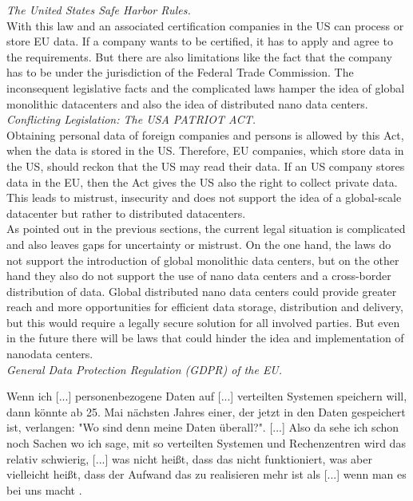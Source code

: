 \textit{The United States Safe Harbor Rules.}\\
With this law and an associated certification companies in the US can process or store EU data. If a company wants to be certified, it has to apply and agree to the requirements. But there are also limitations like the fact that the company has to be under the jurisdiction of the Federal Trade Commission. The inconsequent legislative facts and the complicated laws hamper the idea of global monolithic datacenters and also the idea of distributed nano data centers. \cite{locmat}\\

\textit{Conflicting Legislation: The USA PATRIOT ACT.}\\
Obtaining personal data of foreign companies and persons is allowed by this Act, when the data is stored in the US. Therefore, EU companies, which store data in the US, should reckon that the US may read their data. If an US company stores data in the EU, then the Act gives the US also the right to collect private data. This leads to mistrust, insecurity and does not support the idea of a global-scale datacenter but rather to distributed datacenters. \cite{locmat}\\

As pointed out in the previous sections, the current legal situation is complicated and also leaves gaps for uncertainty or mistrust. On the one hand, the laws do not support the introduction of global monolithic data centers, but on the other hand they also do not support the use of nano data centers and a cross-border distribution of data. Global distributed nano data centers could provide greater reach and more opportunities for efficient data storage, distribution and delivery, but this would require a legally secure solution for all involved parties. But even in the future there will be laws that could hinder the idea and implementation of nanodata centers.\\


\textit{General Data Protection Regulation (GDPR) of the EU.}
\begin{displayquote}
Wenn ich [...] personenbezogene Daten auf [...] verteilten Systemen speichern will, dann könnte ab 25. Mai nächsten Jahres einer, der jetzt in den Daten gespeichert ist, verlangen: "Wo sind denn meine Daten überall?". [...] Also da sehe ich schon noch Sachen wo ich sage, mit so verteilten Systemen und Rechenzentren wird das relativ schwierig, [...] was nicht heißt, dass das nicht funktioniert, was aber vielleicht heißt, dass der Aufwand das zu realisieren mehr ist als [...] wenn man es bei uns macht \cite{kranzlm}.
\end{displayquote}

